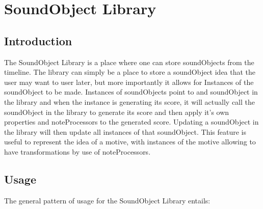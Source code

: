 \section{SoundObject Library}\label{soundObjectLibrary}

\subsection{Introduction}

The SoundObject Library is a place where one can store soundObjects from
the timeline. The library can simply be a place to store a soundObject
idea that the user may want to user later, but more importantly it
allows for Instances of the soundObject to be made. Instances of
soundObjects point to and soundObject in the library and when the
instance is generating its score, it will actually call the soundObject
in the library to generate its score and then apply it's own properties
and noteProcessors to the generated score. Updating a soundObject in the
library will then update all instances of that soundObject. This feature
is useful to represent the idea of a motive, with instances of the
motive allowing to have transformations by use of noteProcessors.

\subsection{Usage}

The general pattern of usage for the SoundObject Library entails:

